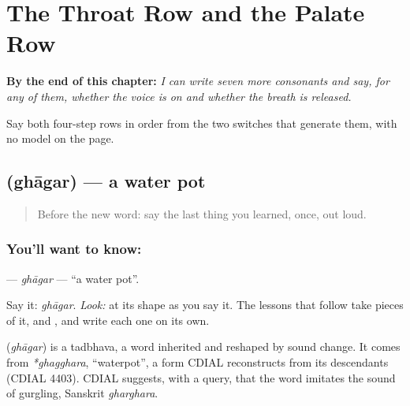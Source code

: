 
\chapter{The Throat Row and the Palate Row}
\label{ch:two-rows-runway}

\begin{chapteropening}
\textbf{By the end of this chapter:} \emph{I can write seven more consonants and say, for any of them, whether the voice is on and whether the breath is released.}

Say both four-step rows in order from the two switches that generate them, with no model on the page.
\end{chapteropening}

\section[\texorpdfstring{\mr{घागर} (ghāgar)}{घागर (ghāgar)}]{ (ghāgar) — a water pot}

\label{lesson:MR-C06-ghagar}



\begin{quote}
Before the new word: say the last thing you learned, once, out loud.
\end{quote}

\subsection*{You'll want to know: }
\textbf{} — \emph{ghāgar} — \textquotedblleft{}a water pot\textquotedblright{}.

Say it: \emph{ghāgar}. \emph{Look:} at its shape as you say it. The lessons that follow take pieces of it, \textbf{} and \textbf{}, and write each one on its own.

\begin{cousinweb}
\textbf{} (\emph{ghāgar}) is a tadbhava, a word inherited and reshaped by sound change. It comes from \emph{*ghagghara}, \textquotedblleft{}waterpot\textquotedblright{}, a form CDIAL reconstructs from its descendants (CDIAL 4403). CDIAL suggests, with a query, that the word imitates the sound of gurgling, Sanskrit \emph{gharghara}.
\end{cousinweb}

